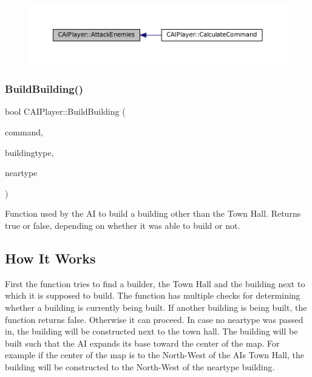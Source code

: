 \begin{figure}[H]
\begin{center}
\leavevmode
\includegraphics[width=350pt]{classCAIPlayer_adf7feeba7debf9f19b000887616d7bfb_icgraph}
\end{center}
\end{figure}
\hypertarget{classCAIPlayer_a2ff5263cbaa6bfc62ffec4dbce87ba88}{}\label{classCAIPlayer_a2ff5263cbaa6bfc62ffec4dbce87ba88} 
\subsubsection{\texorpdfstring{Build\+Building()}{BuildBuilding()}}
{\footnotesize\ttfamily bool C\+A\+I\+Player\+::\+Build\+Building (\begin{DoxyParamCaption}\item[{\hyperlink{structSPlayerCommandRequest}{S\+Player\+Command\+Request} \&}]{command,  }\item[{\hyperlink{GameDataTypes_8h_a5600d4fc433b83300308921974477fec}{E\+Asset\+Type}}]{buildingtype,  }\item[{\hyperlink{GameDataTypes_8h_a5600d4fc433b83300308921974477fec}{E\+Asset\+Type}}]{neartype }\end{DoxyParamCaption})\hspace{0.3cm}{\ttfamily [protected]}}



Function used by the AI to build a building other than the Town Hall. Returns true or false, depending on whether it was able to build or not. 

\hypertarget{classCAIPlayer_bthhow_sec}{}\subsection{How It Works}\label{classCAIPlayer_bthhow_sec}
First the function tries to find a builder, the Town Hall and the building next to which it is supposed to build. The function has multiple checks for determining whether a building is currently being built. If another building is being built, the function returns false. Otherwise it can proceed. In case no neartype was passed in, the building will be constructed next to the town hall. The building will be built such that the AI expands its base toward the center of the map. For example if the center of the map is to the North-\/\+West of the AI\textquotesingle{}s Town Hall, the building will be constructed to the North-\/\+West of the neartype building. 

